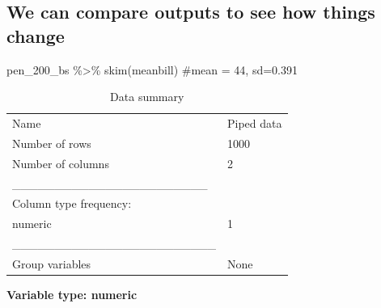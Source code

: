\documentclass[
  letterpaper,
  DIV=11,
  numbers=noendperiod]{scrartcl}
\newenvironment{Shaded}{\begin{snugshade}}{\end{snugshade}}
\newcommand{\CommentTok}[1]{\textcolor[rgb]{0.37,0.37,0.37}{#1}}
\newcommand{\FunctionTok}[1]{\textcolor[rgb]{0.28,0.35,0.67}{#1}}
\newcommand{\NormalTok}[1]{\textcolor[rgb]{0.00,0.23,0.31}{#1}}
\newcommand{\SpecialCharTok}[1]{\textcolor[rgb]{0.37,0.37,0.37}{#1}}
\begin{document}
\hypertarget{we-can-compare-outputs-to-see-how-things-change}{%
\subsection{We can compare outputs to see how things
change}\label{we-can-compare-outputs-to-see-how-things-change}}

\begin{Shaded}
\begin{Highlighting}[]
\NormalTok{pen\_200\_bs }\SpecialCharTok{\%\textgreater{}\%}
  \FunctionTok{skim}\NormalTok{(meanbill) }\CommentTok{\#mean = 44, sd=0.391}
\end{Highlighting}
\end{Shaded}

\begin{longtable}[]{@{}ll@{}}
\caption{Data summary}\tabularnewline
\toprule\noalign{}
\endfirsthead
\endhead
\bottomrule\noalign{}
\endlastfoot
Name & Piped data \\
Number of rows & 1000 \\
Number of columns & 2 \\
\_\_\_\_\_\_\_\_\_\_\_\_\_\_\_\_\_\_\_\_\_\_\_ & \\
Column type frequency: & \\
numeric & 1 \\
\_\_\_\_\_\_\_\_\_\_\_\_\_\_\_\_\_\_\_\_\_\_\_\_ & \\
Group variables & None \\
\end{longtable}

\textbf{Variable type: numeric}
\end{document}
